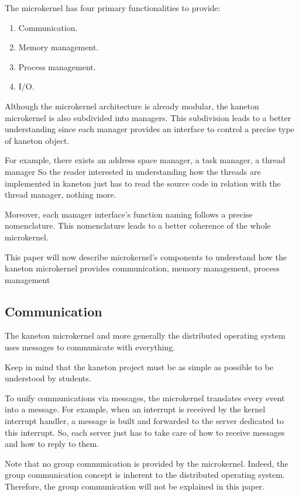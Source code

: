 \begin{multicols}{2}
The microkernel has four primary functionalities to provide:

\begin{enumerate}
  \item
    Communication.
  \item
    Memory management.
  \item
    Process management.
  \item
    I/O.
\end{enumerate}

Although the microkernel architecture is already modular, the kaneton
microkernel is also subdivided into managers. This subdivision leads to
a better understanding since each manager provides an interface to control
a precise type of kaneton object.

For example, there exists an address space manager, a task manager,
a thread manager \etc{} So the reader interested in understanding how
the threads are implemented in kaneton just has to read the source code
in relation with the thread manager, nothing more.

Moreover, each manager interface's function naming follows a precise
nomenclature. This nomenclature leads to a better coherence of the whole
microkernel.

This paper will now describe microkernel's components to understand how
the kaneton microkernel provides communication, memory management, process
management \etc{}

%
%

\subsection{Communication}

The kaneton microkernel and more generally the distributed operating
system uses messages to communicate with everything.

Keep in mind that the kaneton project must be as simple as possible to be
understood by students.

To unify communications via messages, the microkernel translates every event
into a message. For example, when an interrupt is received by the kernel
interrupt handler, a message is built and forwarded to the server dedicated
to this interrupt. So, each server just has to take care of how to receive
messages and how to reply to them.

Note that no group communication is provided by the microkernel. Indeed, the
group communication concept is inherent to the distributed operating system.
Therefore, the group communication will not be explained in this paper.


\end{multicols}

